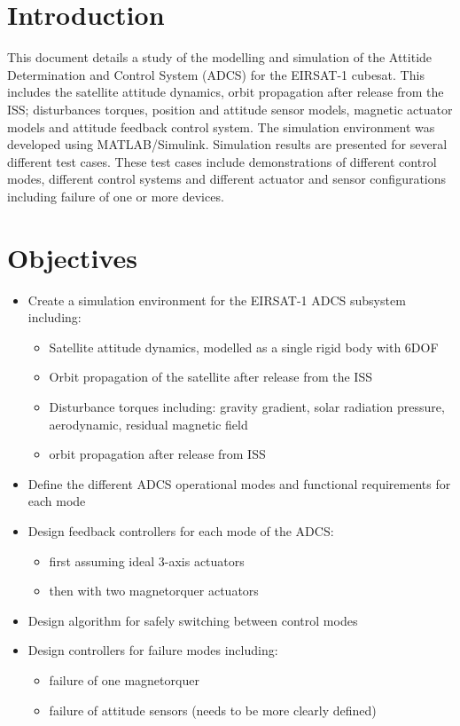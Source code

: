 
\section{Introduction}
This document details a study of the modelling and simulation of the Attitide Determination and Control System (ADCS) for the EIRSAT-1 cubesat.
This includes the satellite attitude dynamics, orbit propagation after release from the ISS; disturbances torques, position and attitude sensor models, magnetic actuator models and attitude feedback control system.
The simulation environment was developed using MATLAB/Simulink.
Simulation results are presented for several different test cases.
These test cases include demonstrations of different control modes, different control systems and different actuator and sensor configurations including failure of one or more devices.

\section{Objectives}
\begin{itemize} 
\item Create a simulation environment for the EIRSAT-1 ADCS subsystem including:
\begin{itemize} 
\item Satellite attitude dynamics, modelled as a single rigid body with 6DOF
\item Orbit propagation of the satellite after release from the ISS
\item Disturbance torques including: gravity gradient, solar radiation pressure, aerodynamic, residual magnetic field
\item orbit propagation after release from ISS
\end{itemize}
\item Define the different ADCS operational modes and functional requirements for each mode
\item Design feedback controllers for each mode of the ADCS:
\begin{itemize} 
\item first assuming ideal 3-axis actuators
\item then with two magnetorquer actuators
\end{itemize}
\item Design algorithm for safely switching between control modes
\item Design controllers for failure modes including:
\begin{itemize} 
\item failure of one magnetorquer
\item failure of attitude sensors (needs to be more clearly defined)
\end{itemize}
\end{itemize} 

